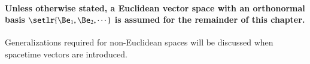 %
%
\paragraph{Unless otherwise stated, a Euclidean vector space with an orthonormal basis \( \setlr{\Be_1, \Be_2, \cdots } \) is assumed for the remainder of this chapter.}
Generalizations required for non-Euclidean spaces will be discussed when spacetime vectors are introduced.
